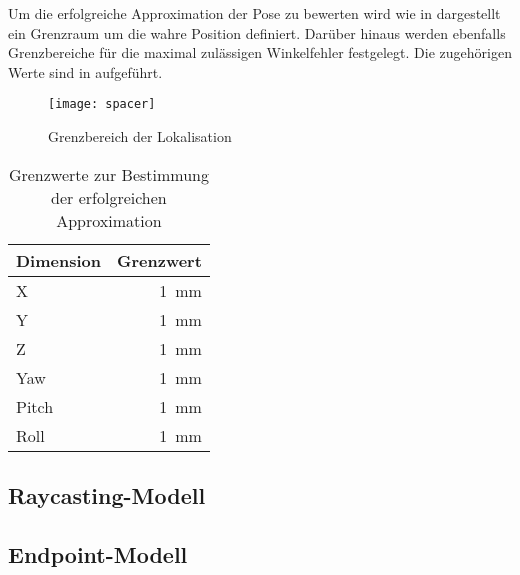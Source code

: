 Um die erfolgreiche Approximation der Pose zu bewerten wird wie in  dargestellt ein Grenzraum um die wahre Position definiert. Darüber hinaus werden ebenfalls Grenzbereiche für die maximal zulässigen Winkelfehler festgelegt. Die zugehörigen Werte sind in  aufgeführt.\\

\begin{figure}[!ht]
	\begin{center}
		\texttt{[image: spacer]}
		\caption{Grenzbereich der Lokalisation}
		\label{fig.loclimits}
	\end{center}
\end{figure}

\begin{table}[ht]
	\centering
	\caption{Grenzwerte zur Bestimmung der erfolgreichen Approximation}\label{tab.TechSpecYouBotBase}
	\vspace*{-3mm}
	\begin{tabular}[ht]{|l|r|}\hline
		\rowcolor{Snow2}
		Dimension		& Grenzwert 					\\ \hline
		X				& \SI{1}{\milli\meter}		\\ \hline		
		Y				& \SI{1}{\milli\meter}		\\ \hline
		Z				& \SI{1}{\milli\meter}		\\ \hline
		Yaw				& \SI{1}{\milli\meter}		\\ \hline
		Pitch			& \SI{1}{\milli\meter}		\\ \hline
		Roll 			& \SI{1}{\milli\meter}		\\ \hline		
		\hline
	\end{tabular} 
	\vspace*{-3mm}
\end{table}


\subsection{Raycasting-Modell}

\subsection{Endpoint-Modell}


